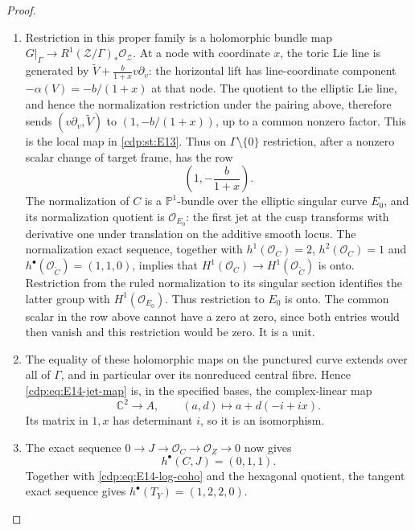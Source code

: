 \begin{proof}
\begin{enumerate}[label=\arabic*.,leftmargin=*]
\item Restriction in this proper family is a holomorphic bundle map
$G|_\Gamma\to R^1(\mathcal Z/\Gamma)_*\mathcal O_{\mathcal Z}$.
At a node with coordinate $x$, the toric Lie line is generated by
$\widetilde V+\frac{b}{1+x}v\partial_v$: the horizontal lift has
line-coordinate component $-\alpha(V)=-b/(1+x)$ at that node.
The quotient to the elliptic Lie line, and hence the normalization
restriction under the pairing above, therefore sends
$(v\partial_v,\widetilde V)$ to
$(1,-b/(1+x))$, up to a common nonzero factor. This is the local
map in \ref{cdp:st:E13}. Thus on $\Gamma\setminus\{0\}$ restriction,
after a nonzero scalar change of target frame, has the row
\[
 \left(1,-\frac{b}{1+x}\right).
\]
The normalization of $C$ is a $\mathbb P^1$-bundle over
the elliptic singular curve $E_0$, and its normalization quotient
is $\mathcal O_{E_0}$: the first jet at the cusp transforms with
derivative one under translation on the additive smooth locus.
The normalization exact sequence, together with
$h^1(\mathcal O_C)=2$, $h^2(\mathcal O_C)=1$ and
$h^\bullet(\mathcal O_{\widetilde C})=(1,1,0)$, implies
that $H^1(\mathcal O_C)\to H^1(\mathcal O_{\widetilde C})$
is onto. Restriction from the ruled normalization to its singular
section identifies the latter group with $H^1(\mathcal O_{E_0})$.
Thus restriction to $E_0$ is onto. The common scalar in the row
above cannot have a zero at zero, since both entries would then
vanish and this restriction would be zero. It is a unit.

\item The equality of these holomorphic maps on the punctured curve
extends over all of $\Gamma$, and in particular over its
nonreduced central fibre. Hence \eqref{cdp:eq:E14-jet-map} is,
in the specified bases, the complex-linear map
\[
 \mathbb C^2\longrightarrow A,\qquad
 (a,d)\longmapsto a+d(-i+ix).
\]
Its matrix in $1,x$ has determinant $i$, so it is an isomorphism.

\item The exact sequence $0\to J\to\mathcal O_C\to\mathcal O_Z\to0$
now gives
\[
 h^\bullet(C,J)=(0,1,1).
\]
Together with \eqref{cdp:eq:E14-log-coho} and the hexagonal quotient,
the tangent exact sequence gives
$h^\bullet(T_Y)=(1,2,2,0)$.


\end{enumerate}
\end{proof}
